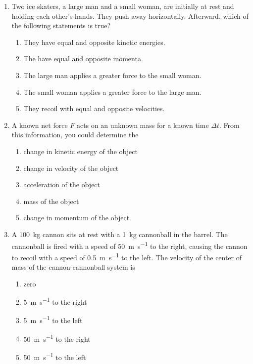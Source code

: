 \documentclass{../../../oss-apphys}
\begin{document}
\begin{multicols}{2}
\begin{enumerate}[leftmargin=18pt,resume]
  \item Two ice skaters, a large man and a small woman, are initially at rest
    and holding each other's hands. They push away horizontally. Afterward,
    which of the following statements is true?
    \begin{enumerate}[nosep,leftmargin=18pt,label=(\Alph*)]
    \item They have equal and opposite kinetic energies.
    \item The have equal and opposite momenta.
    \item The large man applies a greater force to the small woman.
    \item The small woman applies a greater force to the large man.
    \item They recoil with equal and opposite velocities.
    \end{enumerate}
    \vspace{.8in}
    
  \item A known net force $F$ acts on an unknown mass for a known time
    $\Delta t$. From this information, you could determine the
    \begin{enumerate}[nosep,leftmargin=18pt,label=(\Alph*)]
    \item change in kinetic energy of the object
    \item change in velocity of the object
    \item acceleration of the object
    \item mass of the object
    \item change in momentum of the object
    \end{enumerate}
    \vspace{.8in}
    
  \item A \SI{100}{\kilo\gram} cannon sits at rest with a \SI{1}{\kilo\gram}
    cannonball in the barrel. The cannonball is fired with a speed of
    \SI{50}{\metre\per\second} to the right, causing the cannon to recoil with
    a speed of \SI{.5}{\metre\per\second} to the left. The velocity of the
    center of mass of the cannon-cannonball system is
    \begin{enumerate}[nosep,leftmargin=18pt,label=(\Alph*)]
    \item zero
    \item\SI{5}{\metre\per\second} to the right
    \item\SI{5}{\metre\per\second} to the left
    \item\SI{50}{\metre\per\second} to the right
    \item\SI{50}{\metre\per\second} to the left
    \end{enumerate}
  \end{enumerate}
  \columnbreak


\end{multicols}
\end{document}
